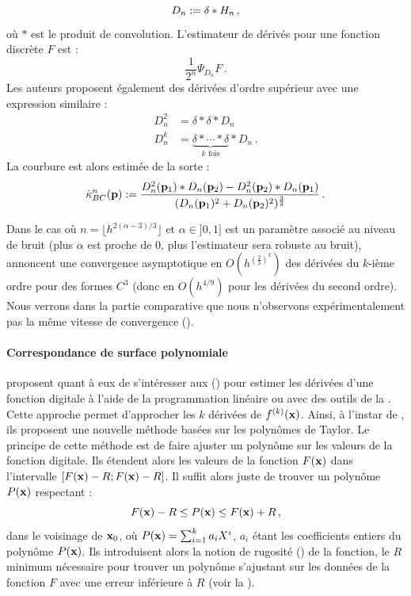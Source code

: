 %
\begin{equation}
  D_n := \delta \ast H_n \,,
\end{equation}
%
où $\ast$ est le produit de convolution. L'estimateur de dérivés pour une fonction discrète $F$ est :
%
\begin{equation}
  \frac{1}{2^n}\Psi_{D_n}F \,.
\end{equation}
%
Les auteurs proposent également des dérivées d'ordre supérieur avec une
expression similaire :
%
\begin{align}
  D_n^2 &= \delta \ast \delta \ast D_n \\
  D_n^k &= \underbrace{\delta \ast \cdots \ast \delta}_{k \text{ fois}} \ast D_n \,.
\end{align}
%
La courbure est alors estimée de la sorte :
%
\begin{equation}
  \hat{\kappa}^{n}_{BC}(\mathbf{p}) := \frac{D_n^2(\mathbf{p}_1) \ast D_n(\mathbf{p}_2) - D_n^2(\mathbf{p}_2) \ast D_n(\mathbf{p}_1)}{(D_n(\mathbf{p}_1)^2 + D_n(\mathbf{p}_2)^2)^\frac{3}{2}} \,.
\end{equation}


Dans le cas où $n = \lfloor h^{2(\alpha -3)/3} \rfloor$ et $\alpha \in ]0,1]$ est un paramètre
associé au niveau de bruit (plus $\alpha$ est proche de $0$, plus l'estimateur
sera robuste au bruit),  annoncent une convergence asymptotique en
$O(h^{{(\frac{2}{3})}^k})$ des dérivées du $k$-ième ordre pour des formes $C^3$ (donc en
$O(h^{4/9})$ pour les dérivées du second ordre). Nous verrons dans la partie
comparative que nous n'observons expérimentalement pas la même vitesse de
convergence ().
%
\paragraph{Correspondance de surface polynomiale}
%
 proposent quant à eux de s'intéresser aux
 (\DLL) pour estimer les dérivées d'une fonction
digitale à l'aide de la programmation linéaire ou avec des outils de la
\AlgorithmicGeometry. Cette approche permet d'approcher les $k$ dérivées de
$f^{(k)}(\mathbf{x})$. Ainsi, à l'instar de \JetFitting, ils proposent une nouvelle
méthode basées sur les polynômes de Taylor.
%
Le principe de cette méthode est de faire ajuster un polynôme sur les valeurs de
la fonction digitale. Ils étendent alors les valeurs de la fonction $F(\mathbf{x})$
dans l'intervalle $[F(\mathbf{x}) - R; F(\mathbf{x}) - R]$. Il suffit alors juste de trouver
un polynôme $P(\mathbf{x})$ respectant :
%
\begin{equation}
    F(\mathbf{x}) - R \le P(\mathbf{x}) \le F(\mathbf{x}) + R \,,
\end{equation}
%
dans le voisinage de $\mathbf{x}_0$, où $P(\mathbf{x}) = \sum_{i=1}^{k} a_iX^i$, $a_i$
étant les coefficients entiers du polynôme $P(\mathbf{x})$. Ils introduisent alors la notion de
rugosité () de la fonction, \cad le $R$ minimum nécessaire
pour trouver un polynôme s'ajustant sur les données de la fonction $F$ avec une
erreur inférieure à $R$ (voir la ).

